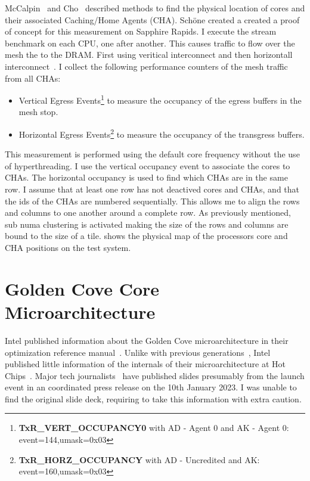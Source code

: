 McCalpin~\cite{McCalpin_2021_CoreMapping} and Cho~\cite{Cho_2022_KnowYourNeighbor} described methods to find the physical location of cores and their associated Caching/Home Agents (CHA).
Schöne created a created a proof of concept for this measurement on Sapphire Rapids.
I execute the stream benchmark on each CPU, one after another.
This causes traffic to flow over the mesh the to the DRAM.
First using veritical interconnect and then horizontall interconnect~\cite{Intel_2018_SkylakeSP}.
I collect the following performance counters of the mesh traffic from all CHAs:
\begin{itemize}
	\item Vertical Egress Events\footnote{\textbf{TxR\_VERT\_OCCUPANCY0} with AD - Agent 0 and AK - Agent 0: event=144,umask=0x03} to measure the occupancy of the egress buffers in the mesh stop.
	\item Horizontal Egress Events\footnote{\textbf{TxR\_HORZ\_OCCUPANCY} with AD - Uncredited and AK: event=160,umask=0x03} to measure the occupancy of the transgress buffers.
\end{itemize}
This measurement is performed using the default core frequency without the use of hyperthreading.
I use the vertical occupancy event to associate the cores to CHAs.
The horizontal occupancy is used to find which CHAs are in the same row.
I assume that at least one row has not deactived cores and CHAs, and that the ids of the CHAs are numbered sequentially.
This allows me to align the rows and columns to one another around a complete row.
As previously mentioned, sub numa clustering is activated making the size of the rows and columns are bound to the size of a tile.
 shows the physical map of the processors core and CHA positions on the test system.

\section{Golden Cove Core Microarchitecture}

Intel published information about the Golden Cove microarchitecture in their optimization reference manual~\cite[Sec. 2.4]{Intel_Optimization_Reference_Manual_050}.
Unlike with previous generations~\cite{Intel_2017_Skylake_SP,Intel_2020_IceLake_SP}, Intel published little information of the internals of their microarchitecture at Hot Chips~\cite{Intel_2021_Hotchips}.
Major tech journalists~\cite{ServerTheHome_2023_SPR_Press,TechGage_2023_SPR_Press,HotHardware_2023_SPR_Press,Wccftech_2023_SPR_Press} have published slides presumably from the launch event in an coordinated press release on the 10th January 2023.
I was unable to find the original slide deck, requiring to take this information with extra caution.

